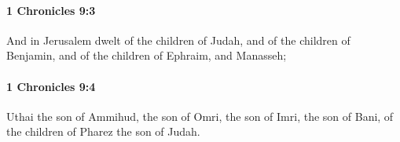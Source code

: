 		\paragraph{1 Chronicles 9:3} %
			\label{1CHRONICLES-9-3}

			And in Jerusalem dwelt of the children of Judah, and of the children of Benjamin, and of the children of Ephraim, and Manasseh;


		\paragraph{1 Chronicles 9:4} %
			\label{1CHRONICLES-9-4}

			Uthai the son of Ammihud, the son of Omri, the son of Imri, the son of Bani, of the children of Pharez the son of Judah.


